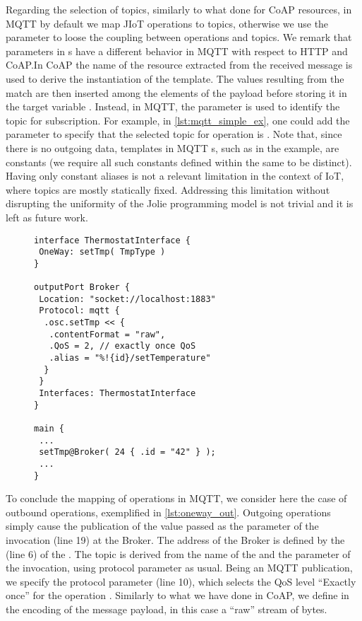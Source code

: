 Regarding the selection of topics, similarly to what done for CoAP resources, in
MQTT by default we map JIoT operations to topics, otherwise we use the
 parameter  to loose the coupling between operations and
topics. We remark that  parameters in s have a
different behavior in MQTT with respect to HTTP and CoAP.\@ In CoAP the name of
the resource extracted from the received message is used to derive the
instantiation of the  template. The values resulting from the match
are then inserted among the elements of the payload before storing it in the
target variable . Instead, in MQTT, the  parameter is
used to identify the topic for subscription. For example, in
\cref{lst:mqtt_simple_ex}, one could add the  parameter
 to specify that the
selected topic for operation  is .
Note that, since there is no outgoing data, templates in MQTT s,
such as  in the example, are constants (we require all such
constants defined within the same  to be distinct). Having only
constant aliases is not a relevant limitation in the context of IoT, where
topics are mostly statically fixed. Addressing this limitation without
disrupting the uniformity of the Jolie programming model is not trivial and it
is left as future work.


\begin{figure}[t]
 \begin{lstlisting}[basicstyle=\footnotesize\ttfamily,caption={Example of
outgoing MQTT \code{OneWay} communication.},label=lst:oneway_out]
interface ThermostatInterface {
 OneWay: setTmp( TmpType )
}

outputPort Broker {
 Location: "socket://localhost:1883"
 Protocol: mqtt {
  .osc.setTmp << {
   .contentFormat = "raw",
   .QoS = 2, // exactly once QoS
   .alias = "%!{id}/setTemperature"
  }
 }
 Interfaces: ThermostatInterface
}

main {
 ...
 setTmp@Broker( 24 { .id = "42" } );
 ...
}
\end{lstlisting}
\end{figure}

To conclude the mapping of  operations in MQTT, we consider here
the case of outbound operations, exemplified in \cref{lst:oneway_out}.
%
Outgoing  operations simply cause the publication of the value
passed as the parameter of the invocation (line 19) at the Broker. The address
of the Broker is defined by the  (line 6) of the
 . The topic is derived from the name of the
 and the parameter of the invocation, using protocol parameter
 as usual. Being an MQTT publication, we specify the 
protocol parameter (line 10), which selects the QoS level ``Exactly once'' for
the operation . Similarly to what we have done in CoAP,
we define in  the
encoding of the message payload, in this case a ``raw'' stream of bytes.


